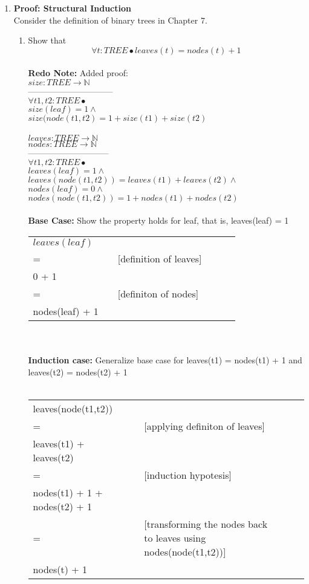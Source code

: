 \documentclass{article}
\begin{document}
\begin{enumerate}[\bf I.]
\item \textbf{Proof: Structural Induction} \\[8pt]
Consider the definition of binary trees in Chapter 7.
\begin{enumerate}
\item Show that
  \[\forall t: TREE \bullet leaves(t) = nodes(t) + 1\] \\
\textbf{Redo Note:} Added proof: \\
$ size: TREE \rightarrow \mathbb{N} $\\
------------------------------ \\
$ \forall t1,t2: TREE \bullet $\\
$ size (leaf) = 1 \land $\\
$ size (node(t1,t2) = 1 + size(t1) + size(t2) $ \\
\\
$leaves : TREE \rightarrow \mathbb{N}$ \\
$nodes: TREE \rightarrow \mathbb{N}$ \\
----------------------------- \\
$ \forall t1,t2: TREE \bullet $\\
$ leaves (leaf) = 1 \land $\\
$ leaves (node(t1,t2)) = leaves(t1) + leaves(t2) \land  $ \\
$ nodes(leaf) = 0 \land$\\
$ nodes(node(t1,t2)) = 1 + nodes(t1) + nodes(t2)$ \\
\\
\textbf{Base Case:} Show the property holds for leaf, that is, leaves(leaf) = 1 \\
\begin{tabular}{l ll lll}
  $leaves(leaf)$  &  &  \\
  =  & & [definition of leaves] \\
  0 + 1 & & \\
  = & & [definiton of nodes] \\
  nodes(leaf) + 1 & & \\
  
\end{tabular} \\
\\
\textbf{Induction case:} Generalize base case for leaves(t1) = nodes(t1) + 1 and leaves(t2) = nodes(t2) + 1  \\
\\
\begin{tabular}{l ll lll}
  leaves(node(t1,t2)) &  &  \\
  = & & [applying definiton of leaves] \\
  leaves(t1) + leaves(t2) & & \\
  = & & [induction hypotesis] \\
  nodes(t1) + 1 + nodes(t2) + 1 \\
  = & & [transforming the nodes back to leaves using nodes(node(t1,t2))] \\
  nodes(t) + 1 & & \\
\end{tabular} \\
\\



\end{enumerate}
\end{enumerate}
\end{document}
